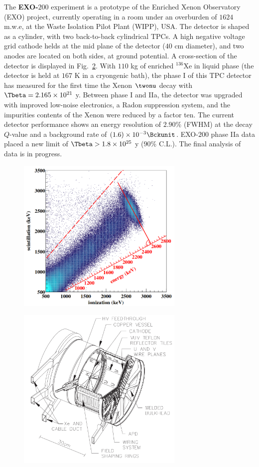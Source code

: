 The \textbf{EXO-$200$} experiment is a prototype of the Enriched Xenon Observatory (EXO) project, currently operating in a room under an overburden of $1624$ m.w.e, at the Waste Isolation Pilot Plant (WIPP), USA.
The detector is shaped as a cylinder, with two back-to-back cylindrical TPCs.
A high negative voltage grid cathode helds at the mid plane of the detector ($40$ cm diameter), and two anodes are located on both sides, at ground potential.
A cross-section of the detector is displayed in Fig.~\ref{fig:EXO-200}.
With $110$ kg of enriched $^{136}$Xe in liquid phase (the detector is held at $167$ K in a cryongenic bath), the phase I of this TPC detector has measured for the first time the Xenon $\twonu$ decay with $\Tbeta=2.165\times 10^{21}$ y.
Between phase I and IIa, the detector was upgraded with improved low-noise electronics, a Radon suppression system, and the impurities contents of the Xenon were reduced by a factor ten.
The current detector performance shows an energy resolution of $2.90$\% (FWHM) at the decay $Q$-value and a background rate of $(1.6)\times 10^{-3}\Bckunit$.
EXO-$200$ phase IIa data placed a new limit of $\Tbeta>1.8\times 10^{25}$ y ($90$\% C.L.).
The final analysis of data is in progress.


\begin{figure}
  \centering
  \includegraphics[width=8cm]{0nubbexperiments/fig_0nubbexperiments/ionisation-to-scintillation_EXO-200.png}
  \caption{}
  \label{fig:ratio_EXO-200}
\end{figure}

\begin{figure}
  \centering
  \includegraphics[width=8cm]{0nubbexperiments/fig_0nubbexperiments/EXO-200.png}
  \caption{}
  \label{fig:EXO-200}
\end{figure}

